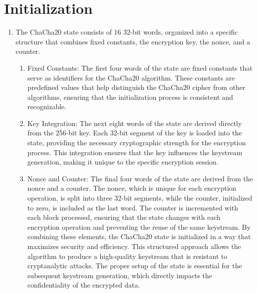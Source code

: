 \documentclass[a4paper,12pt]{report}
\begin{document}
\section{Initialization}
\begin{enumerate}
    \item The ChaCha20 state consists of 16 32-bit words, organized into a specific structure that combines fixed constants, the encryption key, the nonce, and a counter.
    \begin{enumerate}
        \item Fixed Constants: The first four words of the state are fixed constants that serve as identifiers for the ChaCha20 algorithm.
    These constants are predefined values that help distinguish the ChaCha20 cipher from other algorithms, ensuring that the initialization process is consistent and recognizable.
\item Key Integration: The next eight words of the state are derived directly from the 256-bit key.
    Each 32-bit segment of the key is loaded into the state, providing the necessary cryptographic strength for the encryption process.
    This integration ensures that the key influences the keystream generation, making it unique to the specific encryption session.
\item Nonce and Counter: The final four words of the state are derived from the nonce and a counter.
    The nonce, which is unique for each encryption operation, is split into three 32-bit segments, while the counter, initialized to zero, is included as the last word.
    The counter is incremented with each block processed, ensuring that the state changes with each encryption operation and preventing the reuse of the same keystream.
    By combining these elements, the ChaCha20 state is initialized in a way that maximizes security and efficiency.
    This structured approach allows the algorithm to produce a high-quality keystream that is resistant to cryptanalytic attacks.
    The proper setup of the state is essential for the subsequent keystream generation, which directly impacts the confidentiality of the encrypted data.
\end{enumerate}
\end{enumerate}
\end{document}
